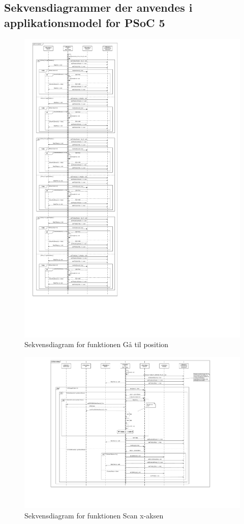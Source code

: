 \subsection{Sekvensdiagrammer der anvendes i applikationsmodel for PSoC 5}
\begin{figure}[H]
	\caption{Sekvensdiagram for funktionen Gå til position}
	\label{SD:PSoC:GaaTilPos}
	\includegraphics[scale=0.29,trim=0 0 1000 0]{APPSoC/SD-Gaa-til-position-v1}
\end{figure}

\begin{figure}[H]
	\caption{Sekvensdiagram for funktionen Scan x-aksen}
	\label{SD:PSoC:ScanX}
	\includegraphics[scale=0.29,trim=200 150 0 0, clip]{APPSoC/SD-Scan-x-aksen}
\end{figure}

